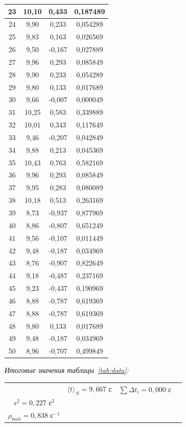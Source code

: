 \documentclass[a4paper,14pt]{extarticle}
\begin{document}
\begin{longtable}{|c|c|c|c|}
		23 & 10,10 & 0,433  & 0,187489 \\ \hline
		24 & 9,90  & 0,233  & 0,054289 \\ \hline
		25 & 9,83  & 0,163  & 0,026569 \\ \hline
		26 & 9,50  & -0,167 & 0,027889 \\ \hline
		27 & 9,96  & 0,293  & 0,085849 \\ \hline
		28 & 9,90  & 0,233  & 0,054289 \\ \hline
		29 & 9,80  & 0,133  & 0,017689 \\ \hline
		30 & 9,66  & -0,007 & 0,000049 \\ \hline
		31 & 10,25 & 0,583  & 0,339889 \\ \hline
		32 & 10,01 & 0,343  & 0,117649 \\ \hline
		33 & 9,46  & -0,207 & 0,042849 \\ \hline
		34 & 9,88  & 0,213  & 0,045369 \\ \hline
		35 & 10,43 & 0,763  & 0,582169 \\ \hline
		36 & 9,96  & 0,293  & 0,085849 \\ \hline
		37 & 9,95  & 0,283  & 0,080089 \\ \hline
		38 & 10,18 & 0,513  & 0,263169 \\ \hline
		39 & 8,73  & -0,937 & 0,877969 \\ \hline
		40 & 8,86  & -0,807 & 0,651249 \\ \hline
		41 & 9,56  & -0,107 & 0,011449 \\ \hline
		42 & 9,48  & -0,187 & 0,034969 \\ \hline
		43 & 8,76  & -0,907 & 0,822649 \\ \hline
		44 & 9,18  & -0,487 & 0,237169 \\ \hline
		45 & 9,23  & -0,437 & 0,190969 \\ \hline
		46 & 8,88  & -0,787 & 0,619369 \\ \hline
		47 & 8,88  & -0,787 & 0,619369 \\ \hline
		48 & 9,80  & 0,133  & 0,017689 \\ \hline
		49 & 9,48  & -0,187 & 0,034969 \\ \hline
		50 & 8,96  & -0,707 & 0,499849 \\ \hline
	\end{longtable}
	\endgroup

	\noindent\textit{Итоговые значения таблицы~\ref{tab:data}:}
	\begin{center}
	\small
	\renewcommand{\arraystretch}{1.25}
	\begin{tabular}{|c|c|c|c|}
		\hline
		& $\langle t \rangle_N = 9{,}667$ с & $\sum \Delta t_i = 0{,}000$ с & \makecell{$\sigma_N = 0{,}476$ с \\ $s^2 = 0{,}227$ с$^2$ \\ $\rho_{\max} = 0{,}838$ с$^{-1}$} \\ \hline
	\end{tabular}
	\end{center}
\end{document}
